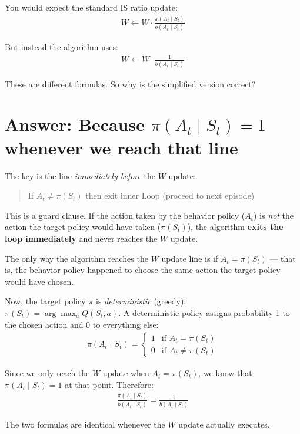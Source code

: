 \documentclass[11pt]{article}
\begin{document}
You would expect the standard IS ratio update:
\begin{align}
    W \leftarrow W \cdot \frac{\pi(A_t \mid S_t)}{b(A_t \mid S_t)}
\end{align}

But instead the algorithm uses:
\begin{align}
    W \leftarrow W \cdot \frac{1}{b(A_t \mid S_t)}
\end{align}

These are different formulas. So why is the simplified version correct?

\section*{Answer: Because $\pi(A_t \mid S_t) = 1$ whenever we reach that line}

The key is the line \textit{immediately before} the $W$ update:
\begin{quote}
    If $A_t \neq \pi(S_t)$ then exit inner Loop (proceed to next episode)
\end{quote}

This is a guard clause. If the action taken by the behavior policy ($A_t$) is \textit{not} the action the target policy would have taken ($\pi(S_t)$), the algorithm \textbf{exits the loop immediately} and never reaches the $W$ update.

The only way the algorithm reaches the $W$ update line is if $A_t = \pi(S_t)$ --- that is, the behavior policy happened to choose the same action the target policy would have chosen.

Now, the target policy $\pi$ is \textit{deterministic} (greedy): $\pi(S_t) = \arg\max_a Q(S_t, a)$. A deterministic policy assigns probability 1 to the chosen action and 0 to everything else:
\begin{align}
    \pi(A_t \mid S_t) = \begin{cases} 1 & \text{if } A_t = \pi(S_t) \\ 0 & \text{if } A_t \neq \pi(S_t) \end{cases}
\end{align}

Since we only reach the $W$ update when $A_t = \pi(S_t)$, we know that $\pi(A_t \mid S_t) = 1$ at that point. Therefore:
\begin{align}
    \frac{\pi(A_t \mid S_t)}{b(A_t \mid S_t)} = \frac{1}{b(A_t \mid S_t)}
\end{align}

The two formulas are identical whenever the $W$ update actually executes.
\end{document}
